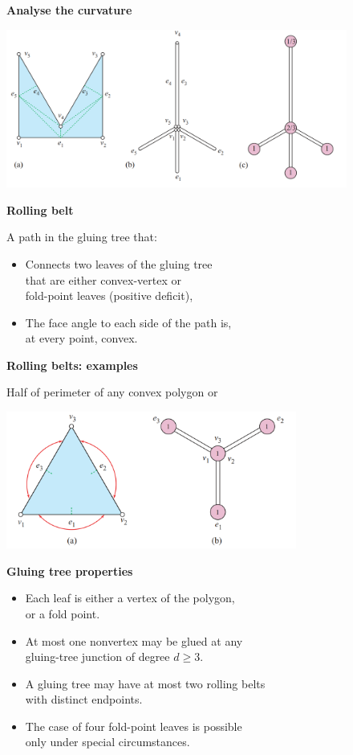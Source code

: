 \documentclass[11pt,a4paper]{extarticle}
\begin{document}
{\large \bf Analyse the curvature}
\begin{center}
	\includegraphics[height=5.2cm]{minilec/gtreecurv}
\end{center}

{\large \bf Rolling belt}

A path in the gluing tree that: \vspace{-5mm}

\begin{itemize}
	\item Connects two leaves of the gluing tree \\
		that are either convex-vertex or \\
		fold-point leaves (positive deficit),
	\item The face angle to each side of the path is, \\
		at every point, convex.
\end{itemize}

{\large \bf Rolling belts: examples}

Half of perimeter of any convex polygon or

\begin{center}
	\includegraphics[height=4.5cm]{minilec/gtreerb}
\end{center}

{\large \bf Gluing tree properties} \vspace{-5mm}

\begin{itemize}[itemsep=-3mm]
	\item Each leaf is either a vertex of the polygon, \\ or a fold point.
	\item At most one nonvertex may be glued at any \\ gluing-tree junction of degree \(d \ge 3\).
	\item A gluing tree may have at most two rolling belts \\ with distinct endpoints.
	\item The case of four fold-point leaves is possible \\ only under special circumstances.
\end{itemize}
\end{document}
